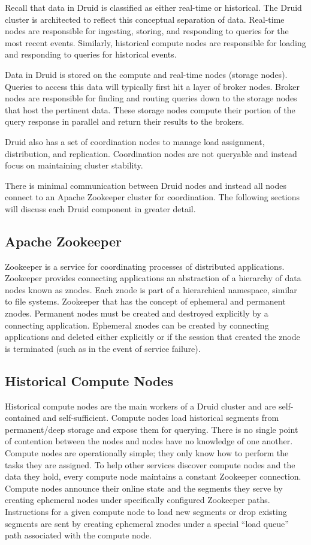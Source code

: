 \documentclass{vldb}
\begin{document}
Recall that data in Druid is classified as either real-time or
historical. The Druid cluster is architected to reflect this
conceptual separation of data. Real-time nodes are responsible for
ingesting, storing, and responding to queries for the most recent
events. Similarly, historical compute nodes are responsible for
loading and responding to queries for historical events.

Data in Druid is stored on the compute and real-time nodes (storage
nodes). Queries to access this data will typically first hit a layer
of broker nodes. Broker nodes are responsible for finding and routing
queries down to the storage nodes that host the pertinent data. These
storage nodes compute their portion of the query response in parallel
and return their results to the brokers.

Druid also has a set of coordination nodes to manage load assignment,
distribution, and replication. Coordination nodes are not queryable
and instead focus on maintaining cluster stability.

There is minimal communication between Druid nodes and instead all
nodes connect to an Apache Zookeeper \cite{hunt2010zookeeper} cluster for
coordination. The following sections will discuss each Druid component
in greater detail.

\subsection{Apache Zookeeper}
Zookeeper is a service for coordinating processes of distributed
applications. Zookeeper provides connecting applications an
abstraction of a hierarchy of data nodes known as znodes. Each znode
is part of a hierarchical namespace, similar to file
systems. Zookeeper that has the concept of ephemeral and permanent
znodes. Permanent nodes must be created and destroyed explicitly by a
connecting application. Ephemeral znodes can be created by connecting
applications and deleted either explicitly or if the session that
created the znode is terminated (such as in the event of service
failure).

\subsection{Historical Compute Nodes}
Historical compute nodes are the main workers of a Druid cluster and
are self-contained and self-sufficient. Compute nodes load historical
segments from permanent/deep storage and expose them for
querying. There is no single point of contention between the nodes and
nodes have no knowledge of one another. Compute nodes are
operationally simple; they only know how to perform the tasks they are
assigned. To help other services discover compute nodes and the data
they hold, every compute node maintains a constant Zookeeper
connection. Compute nodes announce their online state and the segments
they serve by creating ephemeral nodes under specifically configured
Zookeeper paths. Instructions for a given compute node to load new
segments or drop existing segments are sent by creating ephemeral
znodes under a special “load queue” path associated with the compute
node.
\end{document}
